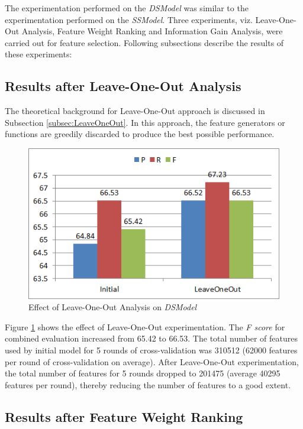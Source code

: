 The experimentation performed on the \textit{DSModel} was similar to the experimentation performed on the \textit{SSModel}. Three experiments, viz. Leave-One-Out Analysis, Feature Weight Ranking and Information Gain Analysis, were carried out for feature selection. Following subsections describe the results of these experiments:

\subsection{Results after Leave-One-Out Analysis}

The theoretical background for Leave-One-Out approach is discussed in Subsection \ref{subsec:LeaveOneOut}. In this approach, the feature generators or functions are greedily discarded to produce the best possible performance.

\begin{figure}
\centering
\includegraphics[scale=0.8]{figures/DSLeaveOneOutComb.png}
\caption{Effect of Leave-One-Out Analysis on \textit{DSModel}}\label{fig:DSLeaveOO}
\end{figure}

Figure \ref{fig:DSLeaveOO} shows the effect of Leave-One-Out experimentation. The \textit{F score} for combined evaluation increased from 65.42 to 66.53. The total number of features used by initial model for 5 rounds of cross-validation was 310512 (62000 features per round of cross-validation on average). After Leave-One-Out experimentation, the total number of features for 5 rounds dropped to 201475 (average 40295 features per round), thereby reducing the number of features to a good extent.

\subsection{Results after Feature Weight Ranking}

